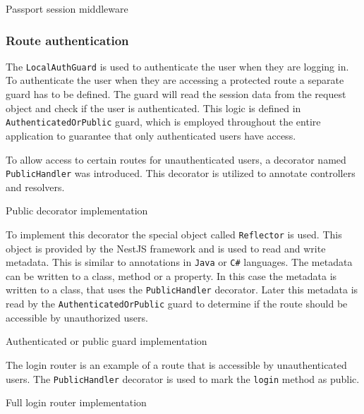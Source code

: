 \documentclass[../main.tex]{subfiles}
\begin{document}
\begin{listing}[H]
  \caption{Passport session middleware}
\end{listing}

\subsubsection{Route authentication}

The \texttt{LocalAuthGuard} is used to authenticate the user when they are logging in. To authenticate the user when they are accessing a protected route
a separate guard has to be defined. The guard will read the session data from the request object and check if the user is authenticated.
This logic is defined in \texttt{AuthenticatedOrPublic} guard, which is employed throughout the entire application to guarantee that only authenticated users have access.


To allow access to certain routes for unauthenticated users, a decorator named \texttt{PublicHandler} was introduced. This decorator is utilized to annotate controllers and resolvers.

\begin{listing}[H]
  \caption{Public decorator implementation}
\end{listing}

To implement this decorator the special object called \texttt{Reflector} is used. This object is provided by the NestJS framework and is used to read and write metadata.
This is similar to annotations in \texttt{Java} or \texttt{C\#} languages. The metadata can be written to a class, method or a property. In this case the metadata is written to a class, that uses the \texttt{PublicHandler} decorator.
Later this metadata is read by the \texttt{AuthenticatedOrPublic} guard to determine if the route should be accessible by unauthorized users.

\begin{listing}[H]
  \caption{Authenticated or public guard implementation}
\end{listing}

The login router is an example of a route that is accessible by unauthenticated users. The \texttt{PublicHandler} decorator is used to mark the \texttt{login} method as public.

\begin{listing}[H]
  \caption{Full login router implementation}
\end{listing}
\end{document}
